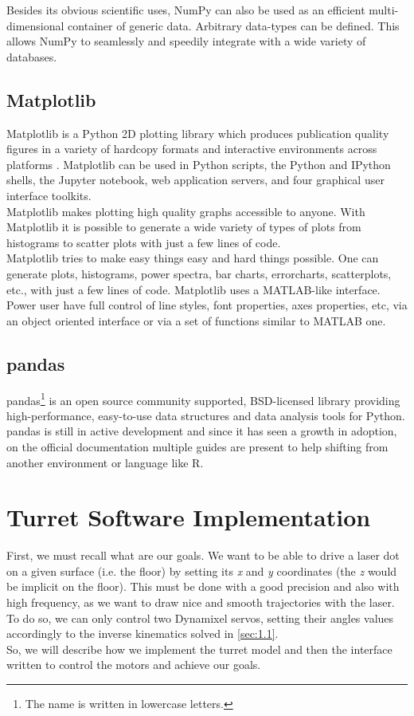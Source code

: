 Besides its obvious scientific uses, NumPy can also be used as an efficient multi-dimensional container of generic data. Arbitrary data-types can be defined. This allows NumPy to seamlessly and speedily integrate with a wide variety of databases.
\subsection{Matplotlib}
Matplotlib is a Python 2D plotting library which produces publication quality figures in a variety of hardcopy formats and interactive environments across platforms \cite{matplotlib}. Matplotlib can be used in Python scripts, the Python and IPython shells, the Jupyter notebook, web application servers, and four graphical user interface toolkits.\\

Matplotlib makes plotting high quality graphs accessible to anyone. With Matplotlib it is possible to generate a wide variety of types of plots from histograms to scatter plots with just a few lines of code.\\

Matplotlib tries to make easy things easy and hard things possible. One can generate plots, histograms, power spectra, bar charts, errorcharts, scatterplots, etc., with just a few lines of code. 
Matplotlib uses a MATLAB-like interface. Power user have full control of line styles, font properties, axes properties, etc, via an object oriented interface or via a set of functions similar to MATLAB one.
\subsection{pandas}
\label{sec:pandas}
pandas\footnote{The name is written in lowercase letters.} is an open source community supported, BSD-licensed library providing high-performance, easy-to-use data structures and data analysis tools for Python. pandas is still in active development and since it has seen a growth in adoption, on the official documentation multiple guides are present to help shifting from another environment or language like R.

\section{Turret Software Implementation}
First, we must recall what are our goals. We want to be able to drive a laser dot on a given surface (i.e. the floor) by setting its \emph{x} and \emph{y} coordinates (the \emph{z} would be implicit on the floor). This must be done with a good precision and also with high frequency, as we want to draw nice and smooth trajectories with the laser. To do so, we can only control two Dynamixel servos, setting their angles values accordingly to the inverse kinematics solved in \ref{sec:1.1}.\\
So, we will describe how we implement the turret model and then the interface written to control the motors and achieve our goals.
